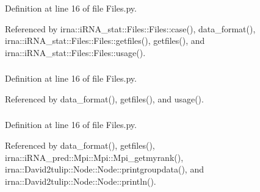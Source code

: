 \-Definition at line 16 of file \-Files.\-py.



\-Referenced by irna\-::i\-R\-N\-A\-\_\-stat\-::\-Files\-::\-Files\-::case(), data\-\_\-format(), irna\-::i\-R\-N\-A\-\_\-stat\-::\-Files\-::\-Files\-::getfiles(), getfiles(), and irna\-::i\-R\-N\-A\-\_\-stat\-::\-Files\-::\-Files\-::usage().

\hypertarget{classirna_1_1David2tulip_1_1Files_1_1Files_a82b79831478f94e2614bf2fde287d4ec}{
\subsubsection[{multilist}]{}}
\label{classirna_1_1David2tulip_1_1Files_1_1Files_a82b79831478f94e2614bf2fde287d4ec}


\-Definition at line 16 of file \-Files.\-py.



\-Referenced by data\-\_\-format(), getfiles(), and usage().

\hypertarget{classirna_1_1David2tulip_1_1Files_1_1Files_a8fa4549f8acbdc6ef286e8312a2a4447}{
\subsubsection[{name}]{}}
\label{classirna_1_1David2tulip_1_1Files_1_1Files_a8fa4549f8acbdc6ef286e8312a2a4447}


\-Definition at line 16 of file \-Files.\-py.



\-Referenced by data\-\_\-format(), getfiles(), irna\-::i\-R\-N\-A\-\_\-pred\-::\-Mpi\-::\-Mpi\-::\-Mpi\-\_\-getmyrank(), irna\-::\-David2tulip\-::\-Node\-::\-Node\-::printgroupdata(), and irna\-::\-David2tulip\-::\-Node\-::\-Node\-::println().

\hypertarget{classirna_1_1David2tulip_1_1Files_1_1Files_a7bd9971105e4c021354903d5ea07d1a6}{
\subsubsection[{p\-Value}]{}}
\label{classirna_1_1David2tulip_1_1Files_1_1Files_a7bd9971105e4c021354903d5ea07d1a6}


